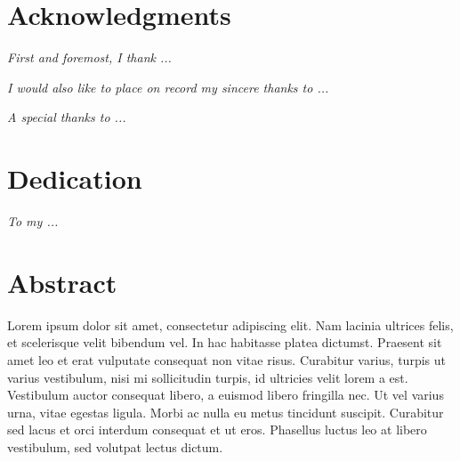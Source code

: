 \documentclass[a4paper, 12pt]{article} %
\begin{document}

\thispagestyle{empty}


\centering
\section*{Acknowledgments} %
\begin{flushleft}
\justifying
\textit{First and foremost, I thank ...}
\end{flushleft}
\vspace{0.5cm}

\begin{flushleft}
\justifying
\textit{I would also like to place on record my sincere thanks to ...}
\end{flushleft}
\vspace{0.5cm}

\begin{flushleft}
\justifying
\textit{A special thanks to ...}
\end{flushleft}
\vspace{1cm}


\section*{Dedication} %
\begin{flushleft}
\justifying
\textit{To my ...}
\end{flushleft}
\vspace{0.5cm}

\newpage


\setcounter{page}{3}

\centering
\section*{Abstract}
\justifying
\noindent
Lorem ipsum dolor sit amet, consectetur adipiscing elit. Nam lacinia ultrices felis, et scelerisque velit bibendum vel. In hac habitasse platea dictumst. Praesent sit amet leo et erat vulputate consequat non vitae risus. Curabitur varius, turpis ut varius vestibulum, nisi mi sollicitudin turpis, id ultricies velit lorem a est. Vestibulum auctor consequat libero, a euismod libero fringilla nec. Ut vel varius urna, vitae egestas ligula. Morbi ac nulla eu metus tincidunt suscipit. Curabitur sed lacus et orci interdum consequat et ut eros. Phasellus luctus leo at libero vestibulum, sed volutpat lectus dictum.
\end{document}
